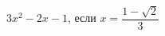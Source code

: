 \begin{ex}[type=calculate_expression]
	\begin{condition}
		\( 3x^2-2x-1 \), \quad если \( x=\dfrac{1-\sqrt{2}}{3} \)
	\end{condition}
\end{ex}